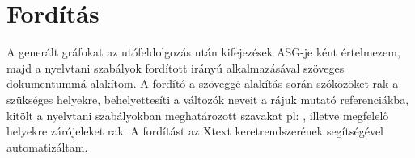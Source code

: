 \section{Fordítás}

A generált gráfokat az utófeldolgozás után kifejezések  ASG-je ként értelmezem, majd a nyelvtani szabályok fordított irányú alkalmazásával szöveges dokumentummá alakítom. A fordító a szöveggé alakítás során szóközöket rak a szükséges helyekre, behelyettesíti a változók neveit a rájuk mutató referenciákba,  kitölt a nyelvtani szabályokban meghatározott szavakat pl:  , illetve megfelelő helyekre  zárójeleket rak. A fordítást az Xtext keretrendszerének segítségével automatizáltam.

